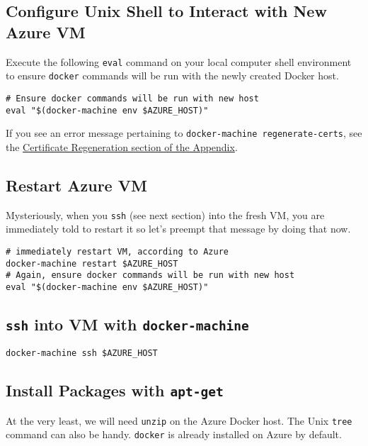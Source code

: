 \documentclass[onecolumn,9pt]{article}
\begin{document}
\subsection{Configure Unix Shell to Interact with New Azure VM}
\label{sec:orgheadline7}

Execute the following \texttt{eval} command on your local computer shell environment to ensure \texttt{docker} commands will be run with the newly created Docker host.

\begin{verbatim}
# Ensure docker commands will be run with new host
eval "$(docker-machine env $AZURE_HOST)"
\end{verbatim}

If you see an error message pertaining to \texttt{docker-machine regenerate-certs}, see the \hyperref[orgtarget5]{Certificate Regeneration section of the Appendix}.

\subsection{Restart Azure VM}
\label{sec:orgheadline8}

Mysteriously, when you \texttt{ssh} (see next section) into the fresh VM, you are immediately told to restart it so let's preempt that message by doing that now.

\begin{verbatim}
# immediately restart VM, according to Azure
docker-machine restart $AZURE_HOST
# Again, ensure docker commands will be run with new host
eval "$(docker-machine env $AZURE_HOST)"
\end{verbatim}


\subsection{\texttt{ssh} into VM with \texttt{docker-machine}}
\label{sec:orgheadline9}

\begin{verbatim}
docker-machine ssh $AZURE_HOST
\end{verbatim}


\subsection{Install Packages with \texttt{apt-get}}
\label{sec:orgheadline10}

At the very least, we will need \texttt{unzip} on the Azure Docker host. The Unix \texttt{tree} command can also be handy. \texttt{docker} is already installed on Azure by default.
\end{document}
